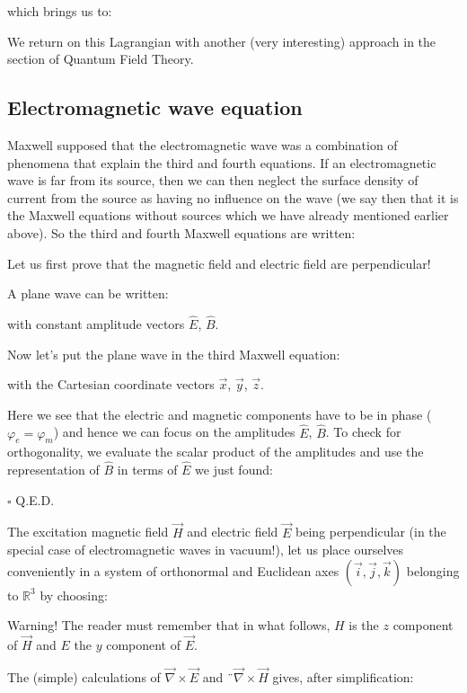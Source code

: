	which brings us to:
	
	\begin{tcolorbox}[title=Remark,colframe=black,arc=10pt]
	We return on this Lagrangian with another (very interesting) approach in the section of Quantum Field Theory.
	\end{tcolorbox}
	
	\pagebreak
	\subsection{Electromagnetic wave equation}\label{electromagnetic wave equation}
	Maxwell supposed that the electromagnetic wave was a combination of phenomena that explain the third and fourth equations. If an electromagnetic wave is far from its source, then we can then neglect the surface density of current from the source as having no influence on the wave (we say then that it is the Maxwell equations without sources which we have already mentioned earlier above). So the third and fourth Maxwell equations are written:
	
	Let us first prove that the magnetic field and electric field are perpendicular!\label{perpendicularity electric magnetic field wave}
	\begin{dem}
	A plane wave can be written:
	
	with constant amplitude vectors $\hat{E}$, $\hat{B}$.

	Now let's put the plane wave in the third Maxwell equation:
	
	with the Cartesian coordinate vectors $\vec{x}$, $\vec{y}$, $\vec{z}$.
	
	Here we see that the electric and magnetic components have to be in phase ($\varphi_e=\varphi_m$) and hence we can focus on the amplitudes $\hat{E}$, $\hat{B}$. To check for orthogonality, we evaluate the scalar product of the amplitudes and use the representation of $\hat{B}$ in terms of $\hat{E}$ we just found:
	
	\begin{flushright}
		$\square$  Q.E.D.
	\end{flushright}
	\end{dem} 
	The excitation magnetic field $\vec{H}$ and electric field  $\vec{E}$ being perpendicular (in the special case of electromagnetic waves in vacuum!), let us place ourselves conveniently in a system of orthonormal and Euclidean axes $(\vec{i},\vec{j},\vec{k})$ belonging to $\mathbb{R}^3$ by choosing:
	
	\begin{tcolorbox}[title=Remark,colframe=black,arc=10pt]
	Warning! The reader must remember that in what follows, $H$ is the $z$ component of $\vec{H}$ and $E$ the $y$ component of $\vec{E}$.
	\end{tcolorbox}
	The (simple) calculations of $\vec{\nabla}\times\vec{E}$ and $¨\vec{\nabla}\times\vec{H}$ gives, after simplification:
	
